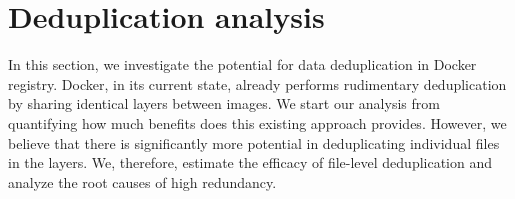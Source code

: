 \section{Deduplication analysis}
\label{sec:redundant_files}

In this section, we investigate the potential for data deduplication in Docker
registry.
%
Docker, in its current state, already performs rudimentary deduplication by
sharing identical layers between images. 
%
We start our analysis from quantifying how much benefits does this existing
approach provides.
%
However, we believe that there is significantly more potential in deduplicating
individual files in the layers.
%
We, therefore, estimate the efficacy of file-level deduplication and analyze
the root causes of high redundancy.



